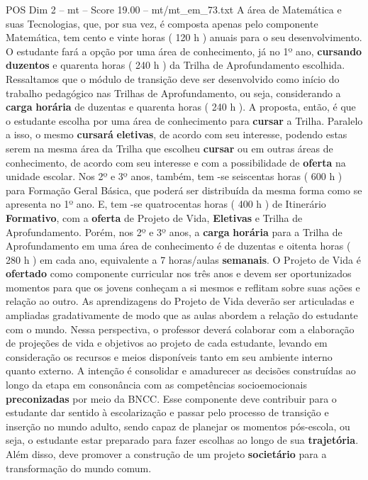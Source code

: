 \begin{textsample}{POS Dim 2 – mt – Score 19.00 – mt/mt\_em\_73.txt}
A área de Matemática e suas Tecnologias, que, por sua vez, é composta apenas pelo componente Matemática, tem cento e vinte horas ( 120 h ) anuais para o seu desenvolvimento.
O estudante fará a opção por uma área de conhecimento, já no 1º ano, \textbf{cursando} \textbf{duzentos} e quarenta horas ( 240 h ) da Trilha de Aprofundamento escolhida.
Ressaltamos que o módulo de transição deve ser desenvolvido como início do trabalho pedagógico nas Trilhas de Aprofundamento, ou seja, considerando a \textbf{carga} \textbf{horária} de duzentas e quarenta horas ( 240 h ).
A proposta, então, é que o estudante escolha por uma área de conhecimento para \textbf{cursar} a Trilha.
Paralelo a isso, o mesmo \textbf{cursará} \textbf{eletivas}, de acordo com seu interesse, podendo estas serem na mesma área da Trilha que escolheu \textbf{cursar} ou em outras áreas de conhecimento, de acordo com seu interesse e com a possibilidade de \textbf{oferta} na unidade escolar.
Nos 2º e 3º anos, também, tem -se seiscentas horas ( 600 h ) para Formação Geral Básica, que poderá ser distribuída da mesma forma como se apresenta no 1º ano.
E, tem -se quatrocentas horas ( 400 h ) de Itinerário \textbf{Formativo}, com a \textbf{oferta} de Projeto de Vida, \textbf{Eletivas} e Trilha de Aprofundamento.
Porém, nos 2º e 3º anos, a \textbf{carga} \textbf{horária} para a Trilha de Aprofundamento em uma área de conhecimento é de duzentas e oitenta horas ( 280 h ) em cada ano, equivalente a 7 horas/aulas \textbf{semanais}.
O Projeto de Vida é \textbf{ofertado} como componente curricular nos três anos e devem ser oportunizados momentos para que os jovens conheçam a si mesmos e reflitam sobre suas ações e relação ao outro.
As aprendizagens do Projeto de Vida deverão ser articuladas e ampliadas gradativamente de modo que as aulas abordem a relação do estudante com o mundo.
Nessa perspectiva, o professor deverá colaborar com a elaboração de projeções de vida e objetivos ao projeto de cada estudante, levando em consideração os recursos e meios disponíveis tanto em seu ambiente interno quanto externo.
A intenção é consolidar e amadurecer as decisões construídas ao longo da etapa em consonância com as competências socioemocionais \textbf{preconizadas} por meio da BNCC.
Esse componente deve contribuir para o estudante dar sentido à escolarização e passar pelo processo de transição e inserção no mundo adulto, sendo capaz de planejar os momentos pós-escola, ou seja, o estudante estar preparado para fazer escolhas ao longo de sua \textbf{trajetória}.
Além disso, deve promover a construção de um projeto \textbf{societário} para a transformação do mundo comum.

\end{textsample}
